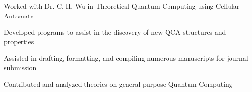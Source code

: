 \documentclass[]{deedy-resume-andrewvanhorn}
\begin{document}
\begin{minipage}[t]{0.66\textwidth}
\section{}
\begin{tightemize}
	\item Worked with Dr. C. H. Wu in Theoretical Quantum Computing using Cellular Automata
	\item Developed programs to assist in the discovery of new QCA structures and properties
	\item Assisted in drafting, formatting, and compiling numerous manuscripts for journal submission
	\item Contributed and analyzed theories on general-purpose Quantum Computing
\end{tightemize}
	



\end{minipage} 
\end{document}
